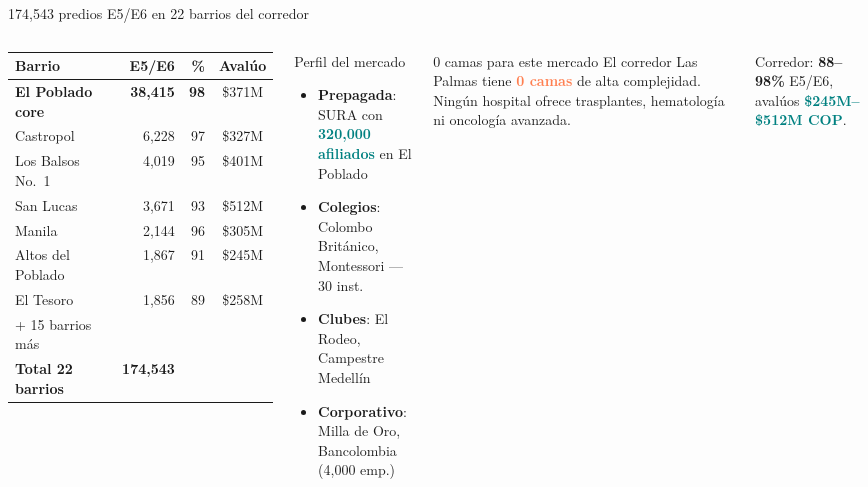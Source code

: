 \documentclass[aspectratio=169, 11pt]{beamer}
\newcommand{\highlight}[1]{\textcolor{teal}{\textbf{#1}}}
\newcommand{\danger}[1]{\textcolor{coral}{\textbf{#1}}}
\newcommand{\src}[1]{\par\vspace{2pt}{\tiny\textcolor{slate}{Fuente: #1}}}
\begin{document}
\begin{frame}{174,543 predios E5/E6 en 22 barrios del corredor}
\begin{columns}[T]
{\scriptsize\setlength{\tabcolsep}{3pt}
\begin{tabular}{@{}lrrc@{}}
\toprule
\textbf{Barrio} & \textbf{E5/E6} & \textbf{\%} & \textbf{Avalúo} \\
\midrule
\rowcolor{teal!8}
\textbf{El Poblado core} & \textbf{38,415} & \textbf{98} & \$371M \\
Castropol & 6,228 & 97 & \$327M \\
Los Balsos No.\ 1 & 4,019 & 95 & \$401M \\
San Lucas & 3,671 & 93 & \$512M \\
Manila & 2,144 & 96 & \$305M \\
\rowcolor{teal!6}
Altos del Poblado & 1,867 & 91 & \$245M \\
El Tesoro & 1,856 & 89 & \$258M \\
{\tiny + 15 barrios más} & & & \\
\midrule
\textbf{Total 22 barrios} & \textbf{174,543} & & \\
\bottomrule
\end{tabular}
}
\src{Catastro Municipal Medellín (bp59-rj8r), 1,041,413 predios}

\begin{exampleblock}{\small Perfil del mercado}
\scriptsize
\begin{itemize}\setlength{\itemsep}{1pt}
  \item \textbf{Prepagada}: SURA con \highlight{320,000 afiliados} en El Poblado
  \item \textbf{Colegios}: Colombo Británico, Montessori --- 30 inst.
  \item \textbf{Clubes}: El Rodeo, Campestre Medellín
  \item \textbf{Corporativo}: Milla de Oro, Bancolombia (4,000 emp.)
\end{itemize}
\end{exampleblock}

\vspace{3pt}
\begin{alertblock}{\small 0 camas para este mercado}
\footnotesize El corredor Las Palmas tiene \danger{0 camas} de alta complejidad. Ningún hospital ofrece trasplantes, hematología ni oncología avanzada.
\end{alertblock}

\vspace{2pt}
{\scriptsize Corredor: \textbf{88--98\%} E5/E6, avalúos \highlight{\$245M--\$512M COP}.}
\end{columns}
\end{frame}
\end{document}
